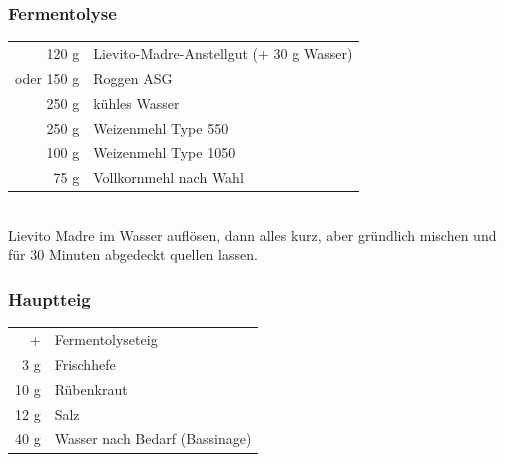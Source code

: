 \subsubsection*{\Gls{Fermentolyse}}
\begin{tabular}{r l}
    120 g & Lievito-Madre-Anstellgut (+ 30 g Wasser)\\
    oder 150 g & Roggen ASG \\
    250 g & kühles Wasser\\
    250 g & Weizenmehl Type 550\\
    100 g & Weizenmehl Type 1050\\
    75  g & Vollkornmehl nach Wahl\\
\end{tabular}\\
Lievito Madre im Wasser auflösen, dann alles kurz, aber gründlich mischen und für 30 Minuten abgedeckt quellen lassen.


\subsubsection*{Hauptteig}
\begin{tabular}{r l}
    + & Fermentolyseteig                                      \\
    3 g & Frischhefe          \\
    10 g & Rübenkraut \\
    12 g & Salz                                                  \\
    40 g & Wasser nach Bedarf (\Gls{Bassinage})                        \\
\end{tabular}\\


